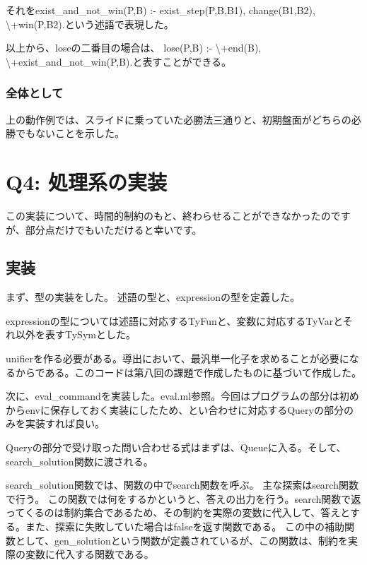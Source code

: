 \documentclass[uplatex,12pt]{jsarticle}
\begin{document}
それをexist\_and\_not\_win(P,B) :- exist\_step(P,B,B1), change(B1,B2), \backslash+win(P,B2).という述語で表現した。

以上から、loseの二番目の場合は、
lose(P,B) :- \backslash+end(B), \backslash+exist\_and\_not\_win(P,B).と表すことができる。

\subsubsection{全体として}
上の動作例では、スライドに乗っていた必勝法三通りと、初期盤面がどちらの必勝でもないことを示した。


\section{Q4: 処理系の実装}

この実装について、時間的制約のもと、終わらせることができなかったのですが、部分点だけでもいただけると幸いです。

\subsection{実装}
まず、型の実装をした。
述語の型と、expressionの型を定義した。

expressionの型については述語に対応するTyFunと、変数に対応するTyVarとそれ以外を表すTySymとした。

\vspace{12pt}

unifierを作る必要がある。導出において、最汎単一化子を求めることが必要になるからである。このコードは第八回の課題で作成したものに基づいて作成した。

\vspace{12pt}

次に、eval\_commandを実装した。eval.ml参照。今回はプログラムの部分は初めからenvに保存しておく実装にしたため、とい合わせに対応するQueryの部分のみを実装すれば良い。

Queryの部分で受け取った問い合わせる式はまずは、Queueに入る。そして、search\_solution関数に渡される。

search\_solution関数では、関数の中でsearch関数を呼ぶ。
主な探索はsearch関数で行う。
この関数では何をするかというと、答えの出力を行う。search関数で返ってくるのは制約集合であるため、その制約を実際の変数に代入して、答えとする。また、探索に失敗していた場合はfalseを返す関数である。
この中の補助関数として、gen\_solutionという関数が定義されているが、この関数は、制約を実際の変数に代入する関数である。
\end{document}

